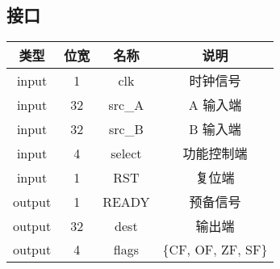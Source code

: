 \subsection{接口}
\begin{tabular}{|c|c|c|c|}
    \hline
    类型       &   位宽    &   名称       &   说明\\\hline
    input      &    1      &    clk      &   时钟信号\\\hline
    input      &   32      &   src\_A    &   A 输入端\\\hline
    input      &   32      &   src\_B    &   B 输入端\\\hline
    input      &   4       &    select   &   功能控制端\\\hline
    input       &   1       &    RST     &   复位端\\\hline
    output       &   1       &    READY  &   预备信号\\\hline
    output      &   32      &    dest    &   输出端\\\hline
    output      &   4       &    flags   &   \{CF, OF, ZF, SF\}\\\hline
\end{tabular}
